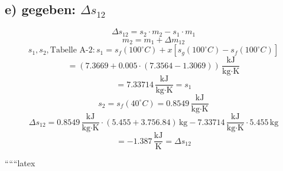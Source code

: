 \subsection*{e) gegeben: \(\Delta s_{12}\)}
\[
\Delta s_{12} = s_2 \cdot m_2 - s_1 \cdot m_1
\]
\[
m_2 = m_1 + \Delta m_{12}
\]
\[
s_1, s_2, \text{Tabelle A-2}: s_1 = s_f (100^\circ C) + x \left[ s_g (100^\circ C) - s_f (100^\circ C) \right]
\]
\[
= (7.3669 + 0.005 \cdot (7.3564 - 1.3069)) \, \frac{\text{kJ}}{\text{kg} \cdot \text{K}}
\]
\[
= 7.33714 \, \frac{\text{kJ}}{\text{kg} \cdot \text{K}} = s_1
\]
\[
s_2 = s_f (40^\circ C) = 0.8549 \, \frac{\text{kJ}}{\text{kg} \cdot \text{K}}
\]
\[
\Delta s_{12} = 0.8549 \, \frac{\text{kJ}}{\text{kg} \cdot \text{K}} \cdot (5.455 + 3.756.84) \, \text{kg} - 7.33714 \, \frac{\text{kJ}}{\text{kg} \cdot \text{K}} \cdot 5.455 \, \text{kg}
\]
\[
= -1.387 \, \frac{\text{kJ}}{\text{K}} = \Delta s_{12}
\]

``````latex